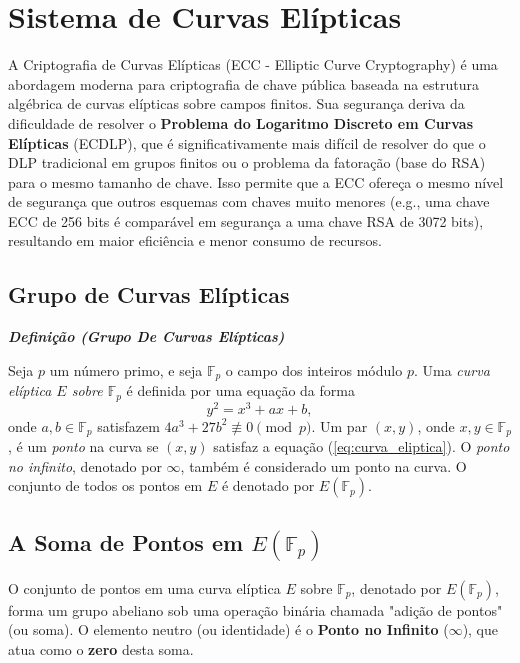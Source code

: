 \documentclass{article}
\theoremstyle{definicao_estilo}
\begin{document}
\section{Sistema de Curvas Elípticas}

A Criptografia de Curvas Elípticas (ECC - Elliptic Curve Cryptography) é uma abordagem moderna para criptografia de chave pública baseada na estrutura algébrica de curvas elípticas sobre campos finitos. Sua segurança deriva da dificuldade de resolver o \textbf{Problema do Logaritmo Discreto em Curvas Elípticas} (ECDLP), que é significativamente mais difícil de resolver do que o DLP tradicional em grupos finitos ou o problema da fatoração (base do RSA) para o mesmo tamanho de chave. Isso permite que a ECC ofereça o mesmo nível de segurança que outros esquemas com chaves muito menores (e.g., uma chave ECC de 256 bits é comparável em segurança a uma chave RSA de 3072 bits), resultando em maior eficiência e menor consumo de recursos.

\subsection{Grupo de Curvas Elípticas}
\textbf{\textit{Definição (Grupo De Curvas Elípticas)}}

Seja $p$ um número primo, e seja $\mathbb{F}_p$ o campo dos inteiros módulo $p$. Uma \emph{curva elíptica $E$ sobre $\mathbb{F}_p$} é definida por uma equação da forma
\begin{equation}
y^2 = x^3 + ax + b,
\tag{1.4}\label{eq:curva_eliptica}
\end{equation}
onde $a, b \in \mathbb{F}_p$ satisfazem $4a^3 + 27b^2 \not\equiv 0 \pmod p$. Um par $(x, y)$, onde $x, y \in \mathbb{F}_p$, é um \emph{ponto} na curva se $(x, y)$ satisfaz a equação (\ref{eq:curva_eliptica}). O \emph{ponto no infinito}, denotado por $\infty$, também é considerado um ponto na curva. O conjunto de todos os pontos em $E$ é denotado por $E(\mathbb{F}_p)$.

\subsection{A Soma de Pontos em $E(\mathbb{F}_p)$}

O conjunto de pontos em uma curva elíptica $E$ sobre $\mathbb{F}_p$, denotado por $E(\mathbb{F}_p)$, forma um grupo abeliano sob uma operação binária chamada "adição de pontos" (ou soma). O elemento neutro (ou identidade) é o \textbf{Ponto no Infinito} ($\infty$), que atua como o \textbf{zero} desta soma.
\end{document}
